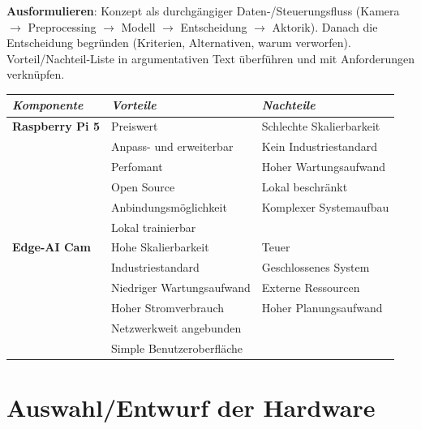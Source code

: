     
\textbf{Ausformulieren}: Konzept als durchgängiger Daten-/Steuerungsfluss (Kamera $\rightarrow$ Preprocessing $\rightarrow$ Modell $\rightarrow$ Entscheidung $\rightarrow$ Aktorik). Danach die Entscheidung begründen (Kriterien, Alternativen, warum verworfen). Vorteil/Nachteil-Liste in argumentativen Text überführen und mit Anforderungen verknüpfen.

    


\begin{table}[]
\begin{tabular}{|l|l|l|}
\hline
\textit{\textbf{Komponente}} & \textit{\textbf{Vorteile}} & \textit{\textbf{Nachteile}} \\ \hline
\textbf{Raspberry Pi 5}      & Preiswert                  & Schlechte Skalierbarkeit    \\ \hline
                             & Anpass- und erweiterbar    & Kein Industriestandard      \\ \hline
                             & Perfomant                  & Hoher Wartungsaufwand       \\ \hline
                             & Open Source                & Lokal beschränkt            \\ \hline
                             & Anbindungsmöglichkeit      & Komplexer Systemaufbau      \\ \hline
                             & Lokal trainierbar          &                             \\ \hline
\textbf{Edge-AI Cam}         & Hohe Skalierbarkeit        & Teuer                       \\ \hline
                             & Industriestandard          & Geschlossenes System        \\ \hline
                             & Niedriger Wartungsaufwand  & Externe Ressourcen          \\ \hline
                             & Hoher Stromverbrauch       & Hoher Planungsaufwand       \\ \hline
                             & Netzwerkweit angebunden    &                             \\ \hline
                             & Simple Benutzeroberfläche  &                             \\ \hline
\end{tabular}
\end{table}


\section{Auswahl/Entwurf der Hardware}

